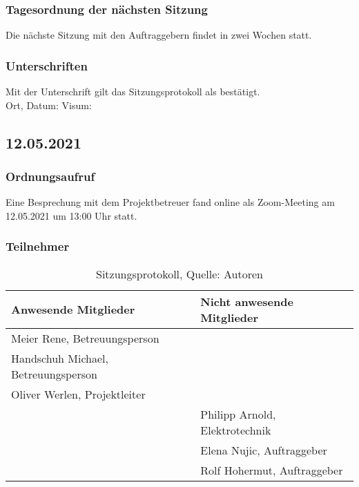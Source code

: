 \subsubsection{Tagesordnung der nächsten Sitzung}
Die nächste Sitzung mit den Auftraggebern findet in zwei Wochen statt. 
\subsubsection{Unterschriften}

Mit der Unterschrift gilt das Sitzungsprotokoll als bestätigt.\\

Ort, Datum:	\underline{\hspace*{6cm}}	\hspace*{1cm} Visum:	\underline{\hspace*{4cm}}

\subsection{12.05.2021}
\subsubsection{Ordnungsaufruf}
Eine Besprechung mit dem Projektbetreuer fand online als Zoom-Meeting am 12.05.2021 um 13:00 Uhr statt.
\subsubsection{Teilnehmer}
\begin{table}[H]
	\setlength\extrarowheight{2pt} %
	\begin{tabularx}{\textwidth}{|X|X|}
		\hline
		\textbf{Anwesende Mitglieder} &  \textbf{Nicht anwesende Mitglieder} \\
		\hline
		Meier Rene, Betreuungsperson &  \\
		Handschuh Michael, Betreuungsperson &   \\
		Oliver Werlen, Projektleiter &  \\
		& Philipp Arnold, Elektrotechnik  \\
		& Elena Nujic, Auftraggeber  \\
		& Rolf Hohermut, Auftraggeber  \\
		\hline
	\end{tabularx}
	\caption{ \label{tbl: Teilnehmerliste vom 12.05.2021}Sitzungsprotokoll, Quelle: Autoren}
\end{table}
